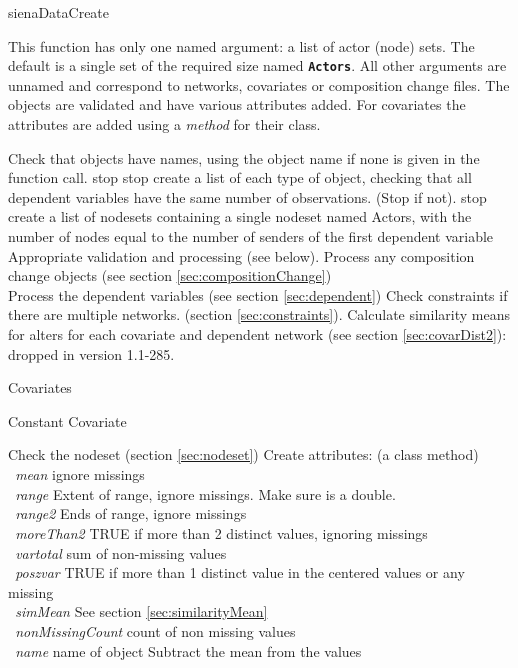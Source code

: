 \documentclass[12pt,a4paper]{article}
\makeatletter
\renewcommand{\=}{\,=\,}
\newcommand{\+}{\,+\,}
\newcommand{\nnm}[1]{\textsf{\textit{#1}}}
\renewcommand{\section}{\@startsection{section}{1}
                {0pt}{\baselineskip}{0.5\baselineskip}
                {\centering\sffamily} }
\renewcommand{\subsection}{\@startsection{subsection}{2}
                {0pt}{0.7\baselineskip}{0.3\baselineskip}
                {\sffamily} }
\renewcommand{\subsubsection}{\@startsection{subsubsection}{3}
                {0pt}{0.5\baselineskip}{0.3\baselineskip}
                {\it\sffamily} }
\newcommand{\sfn}[1]{\textbf{\texttt{#1}}}
\makeatother
\begin{document}
\section{sienaDataCreate}

This function has only one named argument: a list of actor (node) sets. The
default is a single set of the required size named \sfn{Actors}. All other
arguments are unnamed and correspond to networks, covariates or composition
change files. The objects are validated and have various attributes
added. For covariates the attributes are added using a \emph{method} for their
class.

\begin{algorithmic}
\STATE Check that objects have names, using the object name if none is given in
the function call.
\STATE stop
\ENDIF
{}
\STATE stop
\ENDIF
\STATE create a list of each type of object, checking that all dependent
variables have the same number of observations. (Stop if not).
\STATE stop
\ENDIF
{}
\STATE create a list of nodesets containing a single
nodeset named Actors, with the number of nodes equal to the number of senders of
the first dependent variable
\ENDIF
{}
\STATE Appropriate validation and processing (see below).
\ENDFOR
\STATE Process any composition change objects (see section
\ref{sec:compositionChange}) \\
\STATE Process the dependent variables (see section \ref{sec:dependent})
\STATE Check constraints if there are multiple networks. (section
\ref{sec:constraints}).
\STATE Calculate similarity means for alters for each covariate and dependent
network (see section \ref{sec:covarDist2}): dropped in version 1.1-285.
\end{algorithmic}
\subsection{ Covariates}
\subsubsection{Constant Covariate}
\begin{algorithmic}
\STATE Check the nodeset (section \ref{sec:nodeset})
\STATE Create attributes: (a class method)\\
\sfn{ }\nnm{mean} ignore missings\\
\sfn{ }\nnm{range} Extent of range, ignore missings. Make sure is a double.\\
\sfn{ }\nnm{range2} Ends of range, ignore missings\\
\sfn{ }\nnm{moreThan2} TRUE if more than 2 distinct values, ignoring missings\\
\sfn{ }\nnm{vartotal} sum of non-missing values\\
\sfn{ }\nnm{poszvar} TRUE if more than 1 distinct value in the centered values
or any missing\\
\sfn{ }\nnm{simMean} See section \ref{sec:similarityMean}\\
\sfn{ }\nnm{nonMissingCount} count of non missing values\\
\sfn{ }\nnm{name} name of object
\STATE Subtract the mean from the values
\end{algorithmic}
\end{document}

